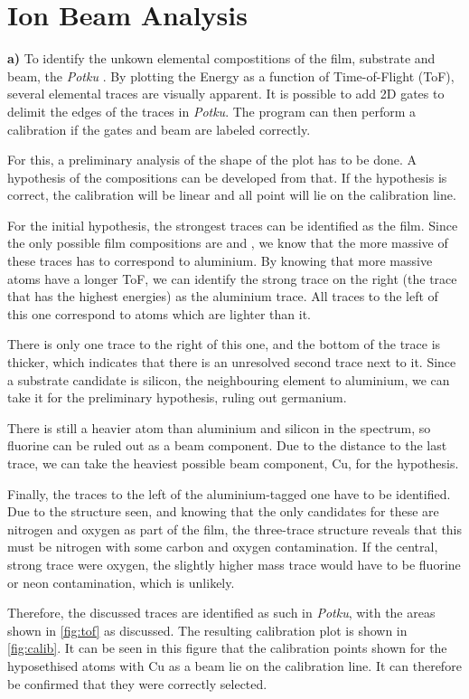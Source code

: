 \section{Ion Beam Analysis}
\textbf{a)} To identify the unkown elemental compostitions of the film, substrate and beam, the \textit{Potku} \cite{potku}. By plotting the Energy as a function of Time-of-Flight (ToF), several elemental traces are visually apparent. It is possible to add 2D gates to delimit the edges of the traces in \textit{Potku}. The program can then perform a calibration if the gates and beam are labeled correctly. 

For this, a preliminary analysis of the shape of the plot has to be done. A hypothesis of the compositions can be developed from that. If the hypothesis is correct, the calibration will be linear and all point will lie on the calibration line. 

For the initial hypothesis, the strongest traces can be identified as the film. Since the only possible film compositions are  and , we know that the more massive of these traces has to correspond to aluminium. By knowing that more massive atoms have a longer ToF, we can identify the strong trace on the right (the trace that has the highest energies) as the aluminium trace. All traces to the left of this one correspond to atoms which are lighter than it. 

There is only one trace to the right of this one, and the bottom of the trace is thicker, which indicates that there is an unresolved second trace next to it. Since a substrate candidate is silicon, the neighbouring element to aluminium, we can take it for the preliminary hypothesis, ruling out germanium. 

There is still a heavier atom than aluminium and silicon in the spectrum, so fluorine can be ruled out as a beam component. Due to the distance to the last trace, we can take the heaviest possible beam component, Cu, for the hypothesis.

Finally, the traces to the left of the aluminium-tagged one have to be identified. Due to the structure seen, and knowing that the only candidates for these are nitrogen and oxygen as part of the film, the three-trace structure reveals that this must be nitrogen with some carbon and oxygen contamination. If the central, strong trace were oxygen, the slightly higher mass trace would have to be fluorine or neon contamination, which is unlikely.

Therefore, the discussed traces are identified as such in \textit{Potku}, with the areas shown in \autoref{fig:tof} as discussed. The resulting calibration plot is shown in \autoref{fig:calib}. It can be seen in this figure that the calibration points shown for the hyposethised atoms with Cu as a beam lie on the calibration line. It can therefore be confirmed that they were correctly selected.

